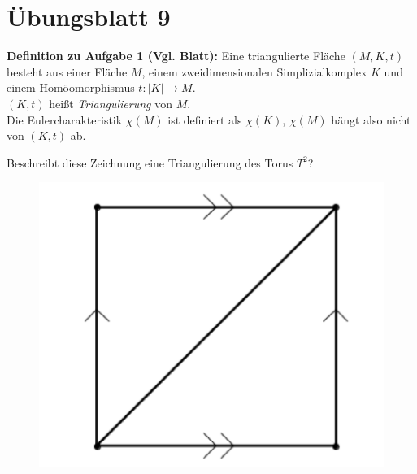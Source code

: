 %
\section{Übungsblatt 9}
\setcounter{problemcounter}{0}

\textbf{Definition zu Aufgabe 1 (Vgl. Blatt):} Eine triangulierte Fläche \( (M, K, t) \) besteht aus einer Fläche \( M \), einem zweidimensionalen Simplizialkomplex \( K \) und einem Homöomorphismus \( t: \vert K \vert \to M \). \\
\( (K, t) \) heißt \emph{Triangulierung} von \( M \). \\
Die Eulercharakteristik \( \chi(M) \) ist definiert als \( \chi(K) \), \( \chi(M) \) hängt also nicht von \( (K,t) \) ab.

\begin{assignment}
  Beschreibt diese Zeichnung eine Triangulierung des Torus \( T^2 \)?
  \begin{figure}[H]
    \centering
    \includegraphics[width=.3\textwidth]{assets/images/triangulation_torus.png}
  \end{figure}
\end{assignment}


